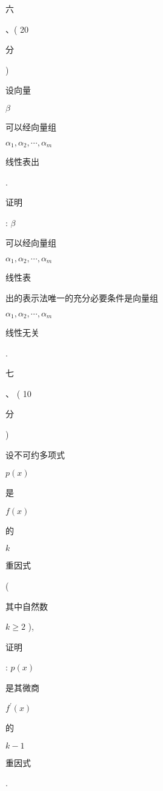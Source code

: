 \documentclass[10pt]{article}
\begin{document}
\begin{CJK}{UTF8}{mj}六\end{CJK}、( 20 \begin{CJK}{UTF8}{mj}分\end{CJK}) \begin{CJK}{UTF8}{mj}设向量\end{CJK} $\beta$ \begin{CJK}{UTF8}{mj}可以经向量组\end{CJK} $\alpha_{1}, \alpha_{2}, \cdots, \alpha_{m}$ \begin{CJK}{UTF8}{mj}线性表出\end{CJK}. \begin{CJK}{UTF8}{mj}证明\end{CJK}: $\beta$ \begin{CJK}{UTF8}{mj}可以经向量组\end{CJK} $\alpha_{1}, \alpha_{2}, \cdots, \alpha_{m}$ \begin{CJK}{UTF8}{mj}线性表\end{CJK} \begin{CJK}{UTF8}{mj}出的表示法唯一的充分必要条件是向量组\end{CJK} $\alpha_{1}, \alpha_{2}, \cdots, \alpha_{m}$ \begin{CJK}{UTF8}{mj}线性无关\end{CJK}. \begin{CJK}{UTF8}{mj}七\end{CJK}、 ( 10 \begin{CJK}{UTF8}{mj}分\end{CJK}) \begin{CJK}{UTF8}{mj}设不可约多项式\end{CJK} $p(x)$ \begin{CJK}{UTF8}{mj}是\end{CJK} $f(x)$ \begin{CJK}{UTF8}{mj}的\end{CJK} $k$ \begin{CJK}{UTF8}{mj}重因式\end{CJK} (\begin{CJK}{UTF8}{mj}其中自然数\end{CJK} $k \geqslant 2$ ), \begin{CJK}{UTF8}{mj}证明\end{CJK}: $p(x)$ \begin{CJK}{UTF8}{mj}是其微商\end{CJK} $f^{\prime}(x)$ \begin{CJK}{UTF8}{mj}的\end{CJK} $k-1$ \begin{CJK}{UTF8}{mj}重因式\end{CJK}.
\end{document}
